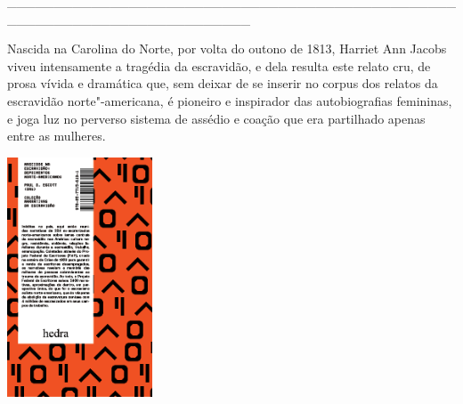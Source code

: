 \hspace*{-2cm}\_\_\_\_\_\_\_\_\_\_\_\_\_\_\_\_\_\_\_\_\_\_\_\_\_\_\_\_\_\_\_\_\_\_\_\_\_\_\_\_\_\_\_\_\_\_\_\_\_\_\_\_\_\_\_\_\_\_\_\_\_\_\_\_\_\_\_\_\_\_\_\_\_\_

\medskip

\noindent{}Nascida na Carolina do Norte, por volta do outono de 1813, Harriet Ann Jacobs viveu intensamente a tragédia da escravidão, e dela resulta este relato cru, de prosa vívida e dramática que, sem deixar de se inserir no corpus dos relatos da escravidão norte"-americana, é pioneiro e inspirador das autobiografias femininas, e joga luz no perverso sistema de assédio e coação que era partilhado apenas entre as mulheres.

\hspace{.5cm}

\hspace*{-.4cm}\begin{minipage}[c]{0.90\linewidth}
\small{
{}}
\end{minipage}


\pagebreak

\hspace{.5cm}

\begin{center}
\hspace*{-.5cm}\includegraphics[width=43mm]{./imgs/wpa.png}
\end{center}

